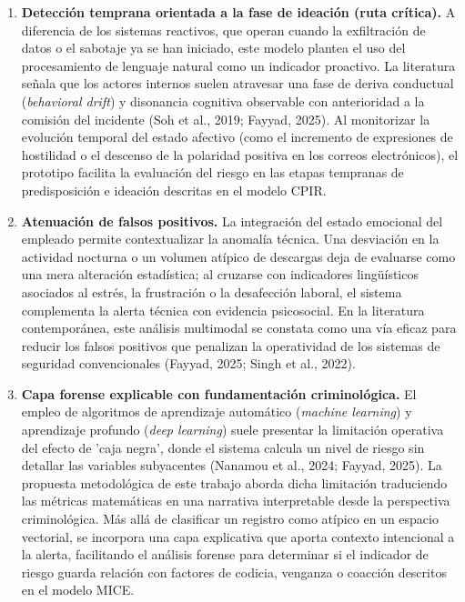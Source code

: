 \documentclass[IB]{TFUOC}%
\begin{document}
\begin{enumerate}
    \item \textbf{Detección temprana orientada a la fase de ideación (ruta crítica).}\newline
    A diferencia de los sistemas reactivos, que operan cuando la exfiltración de datos o el sabotaje ya se han iniciado, este modelo plantea el uso del procesamiento de lenguaje natural como un indicador proactivo. La literatura señala que los actores internos suelen atravesar una fase de deriva conductual (\textit{behavioral drift}) y disonancia cognitiva observable con anterioridad a la comisión del incidente (Soh et al., 2019; Fayyad, 2025). Al monitorizar la evolución temporal del estado afectivo (como el incremento de expresiones de hostilidad o el descenso de la polaridad positiva en los correos electrónicos), el prototipo facilita la evaluación del riesgo en las etapas tempranas de predisposición e ideación descritas en el modelo CPIR.

    \item \textbf{Atenuación de falsos positivos.}\newline
    La integración del estado emocional del empleado permite contextualizar la anomalía técnica. Una desviación en la actividad nocturna o un volumen atípico de descargas deja de evaluarse como una mera alteración estadística; al cruzarse con indicadores lingüísticos asociados al estrés, la frustración o la desafección laboral, el sistema complementa la alerta técnica con evidencia psicosocial. En la literatura contemporánea, este análisis multimodal se constata como una vía eficaz para reducir los falsos positivos que penalizan la operatividad de los sistemas de seguridad convencionales (Fayyad, 2025; Singh et al., 2022).

    \item \textbf{Capa forense explicable con fundamentación criminológica.}\newline
    El empleo de algoritmos de aprendizaje automático (\textit{machine learning}) y aprendizaje profundo (\textit{deep learning}) suele presentar la limitación operativa del efecto de 'caja negra', donde el sistema calcula un nivel de riesgo sin detallar las variables subyacentes (Nanamou et al., 2024; Fayyad, 2025). La propuesta metodológica de este trabajo aborda dicha limitación traduciendo las métricas matemáticas en una narrativa interpretable desde la perspectiva criminológica. Más allá de clasificar un registro como atípico en un espacio vectorial, se incorpora una capa explicativa que aporta contexto intencional a la alerta, facilitando el análisis forense para determinar si el indicador de riesgo guarda relación con factores de codicia, venganza o coacción descritos en el modelo MICE.
\end{enumerate}
\end{document}

